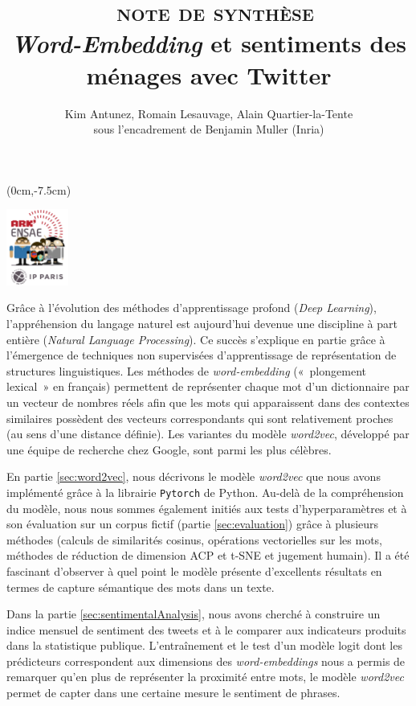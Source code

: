 \documentclass[10pt,french,french]{article}
\title{~\textsc{note de synthèse}\\
\hspace*{0.333em}\emph{Word-Embedding} et sentiments des ménages avec Twitter}
\author{Kim Antunez, Romain Lesauvage, Alain Quartier-la-Tente\\
sous l'encadrement de Benjamin Muller (Inria)}
\date{}
\begin{document}
\maketitle


\begin{textblock*}{\textwidth}(0cm,-7.5cm)
\begin{center}
\includegraphics[height=2.5cm]{img/LOGO-ENSAE.png}
\end{center}
\end{textblock*}

Grâce à l'évolution des méthodes d'apprentissage profond (\emph{Deep Learning}), l'appréhension du langage naturel est aujourd'hui devenue une discipline à part entière (\emph{Natural Language Processing}).
Ce succès s'explique en partie grâce à l'émergence de techniques non supervisées d'apprentissage de représentation de structures linguistiques.
Les méthodes de \emph{word-embedding} («~plongement lexical~» en français) permettent de représenter chaque mot d'un dictionnaire par un vecteur de nombres réels afin que les mots qui apparaissent dans des contextes similaires possèdent des vecteurs correspondants qui sont relativement proches (au sens d'une distance définie).
Les variantes du modèle \emph{word2vec}, développé par une équipe de recherche chez Google, sont parmi les plus célèbres.

En partie \ref{sec:word2vec}, nous décrivons le modèle \emph{word2vec} que nous avons implémenté grâce à la librairie \texttt{Pytorch} de Python.
Au-delà de la compréhension du modèle, nous nous sommes également initiés aux tests d'hyperparamètres et à son évaluation sur un corpus fictif (partie \ref{sec:evaluation}) grâce à plusieurs méthodes (calculs de similarités cosinus, opérations vectorielles sur les mots, méthodes de réduction de dimension ACP et t-SNE et jugement humain).
Il a été fascinant d'observer à quel point le modèle présente d'excellents résultats en termes de capture sémantique des mots dans un texte.

Dans la partie \ref{sec:sentimentalAnalysis}, nous avons cherché à construire un indice mensuel de sentiment des tweets et à le comparer aux indicateurs produits dans la statistique publique.
L'entraînement et le test d'un modèle logit dont les prédicteurs correspondent aux dimensions des \emph{word-embeddings} nous a permis de remarquer qu'en plus de représenter la proximité entre mots, le modèle \emph{word2vec} permet de capter dans une certaine mesure le sentiment de phrases.
\end{document}
